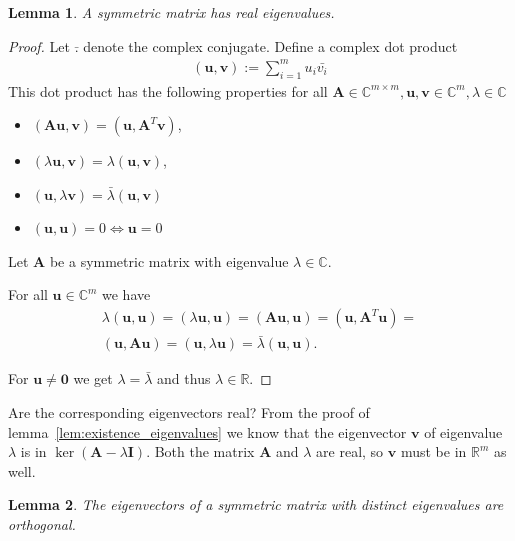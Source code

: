 \documentclass[a4paper]{IEEEtran}
\newtheorem{lemma}{Lemma}
\begin{document}
\begin{lemma}
	A symmetric matrix has real eigenvalues.
\end{lemma}

\begin{proof}
	Let $\bar{.}$ denote the complex conjugate. Define a complex dot product
	\begin{align*}
		(\mathbf{u}, \mathbf{v}) := \sum_{i=1}^{m} u_i \bar{v_i}
	\end{align*}
	This dot product has the following properties for all $\mathbf{A} \in \mathbb{C}^{m\times m}, \mathbf{u}, \mathbf{v} \in \mathbb{C}^m, \lambda \in \mathbb{C}$
	\begin{itemize}
		\item $(\mathbf{Au}, \mathbf{v}) = (\mathbf{u}, \mathbf{A}^T\mathbf{v})$,
		\item $(\lambda \mathbf{u}, \mathbf{v}) = \lambda(\mathbf{u}, \mathbf{v})$,
		\item $(\mathbf{u}, \lambda \mathbf{v}) = \bar{\lambda} (\mathbf{u}, \mathbf{v})$
		\item $(\mathbf{u}, \mathbf{u}) = 0 \iff \mathbf{u} = 0$
	\end{itemize}
	
	Let $\mathbf{A}$ be a symmetric matrix with eigenvalue $\lambda \in \mathbb{C}$.
	
	For all $\mathbf{u} \in \mathbb{C}^m$ we have
	\begin{align*}
		\lambda (\mathbf{u}, \mathbf{u}) = (\lambda \mathbf{u}, \mathbf{u}) = (\mathbf{Au}, \mathbf{u}) = (\mathbf{u}, \mathbf{A}^T\mathbf{u}) =\\
		(\mathbf{u}, \mathbf{Au}) =	(\mathbf{u}, \lambda\mathbf{u}) = \bar{\lambda} (\mathbf{u}, \mathbf{u}).
	\end{align*}
	
	For $\mathbf{u} \neq \mathbf{0}$ we get $\lambda = \bar{\lambda}$ and thus $\lambda \in \mathbb{R}$.
\end{proof}

Are the corresponding eigenvectors real? From the proof of lemma~\ref{lem:existence_eigenvalues} we know that the eigenvector $\mathbf{v}$ of eigenvalue $\lambda$ is in $\ker(\mathbf{A} - \lambda\mathbf{I})$. Both the matrix $\mathbf{A}$ and $\lambda$ are real, so $\mathbf{v}$ must be in $\mathbb{R}^m$ as well.

\begin{lemma}
	\label{lem:symmetric_matrix_eigenvector_orthogonal}
	The eigenvectors of a symmetric matrix with distinct eigenvalues are orthogonal.
\end{lemma}
\end{document}
